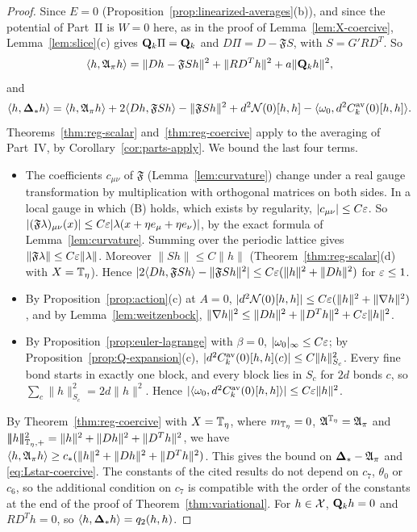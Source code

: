 \begin{proof}
Since $E=0$ (Proposition~\ref{prop:linearized-averages}(b)), and since the potential of Part~II is $W=0$ here, as in the proof of Lemma~\ref{lem:X-coercive}, Lemma~\ref{lem:slice}(c) gives $\mathbf Q_k\Pi=\mathbf Q_k$ and $D\Pi=D-\mathfrak FS$, with $S=G'RD^T$. So
\[
\langle h,\mathfrak A_\pi h\rangle=\|Dh-\mathfrak FSh\|^2+\|RD^Th\|^2+a\|\mathbf Q_kh\|^2,
\]
and
\[
\langle h,\boldsymbol{\Delta}_*h\rangle=\langle h,\mathfrak A_\pi h\rangle+2\langle Dh,\mathfrak FSh\rangle-\|\mathfrak FSh\|^2+d^2\mathcal N(0)[h,h]-\langle \omega_0,d^2C^{\rm av}_k(0)[h,h]\rangle .
\]
Theorems~\ref{thm:reg-scalar} and~\ref{thm:reg-coercive} apply to the averaging of Part~IV, by Corollary~\ref{cor:parts-apply}. We bound the last four terms.
\begin{itemize}
\item The coefficients $c_{\mu\nu}$ of $\mathfrak F$ (Lemma~\ref{lem:curvature}) change under a real gauge transformation by multiplication with orthogonal matrices on both sides. In a local gauge in which (B) holds, which exists by regularity, $|c_{\mu\nu}|\le C\varepsilon$. So $|(\mathfrak F\lambda)_{\mu\nu}(x)|\le C\varepsilon|\lambda(x+\eta e_\mu+\eta e_\nu)|$, by the exact formula of Lemma~\ref{lem:curvature}. Summing over the periodic lattice gives $\|\mathfrak F\lambda\|\le C\varepsilon\|\lambda\|$. Moreover $\|Sh\|\le C\|h\|$ (Theorem~\ref{thm:reg-scalar}(d) with $X=\mathbb T_\eta$). Hence $|2\langle Dh,\mathfrak FSh\rangle-\|\mathfrak FSh\|^2|\le C\varepsilon(\|h\|^2+\|Dh\|^2)$ for $\varepsilon\le1$.
\item By Proposition~\ref{prop:action}(c) at $A=0$, $|d^2\mathcal N(0)[h,h]|\le C\varepsilon(\|h\|^2+\|\nabla h\|^2)$, and by Lemma~\ref{lem:weitzenbock}, $\|\nabla h\|^2\le\|Dh\|^2+\|D^Th\|^2+C\varepsilon\|h\|^2$.
\item By Proposition~\ref{prop:euler-lagrange} with $\beta=0$, $|\omega_0|_\infty\le C\varepsilon$; by Proposition~\ref{prop:Q-expansion}(c), $|d^2C^{\rm av}_k(0)[h,h](c)|\le C\|h\|^2_{S_c}$. Every fine bond starts in exactly one block, and every block lies in $S_c$ for $2d$ bonds $c$, so $\sum_c\|h\|^2_{S_c}=2d\|h\|^2$. Hence $|\langle \omega_0,d^2C^{\rm av}_k(0)[h,h]\rangle|\le C\varepsilon\|h\|^2$.
\end{itemize}
By Theorem~\ref{thm:reg-coercive} with $X=\mathbb T_\eta$, where $m_{\mathbb T_\eta}=0$, $\mathfrak A^{\mathbb T_\eta}=\mathfrak A_\pi$ and $|\!|\!|h|\!|\!|_{\mathbb T_\eta,+}^2=\|h\|^2+\|Dh\|^2+\|D^Th\|^2$, we have $\langle h,\mathfrak A_\pi h\rangle\ge c_*(\|h\|^2+\|Dh\|^2+\|D^Th\|^2)$. This gives the bound on $\boldsymbol{\Delta}_*-\mathfrak A_\pi$ and \eqref{eq:Lstar-coercive}. The constants of the cited results do not depend on $c_7$, $\theta_0$ or $c_6$, so the additional condition on $c_7$ is compatible with the order of the constants at the end of the proof of Theorem~\ref{thm:variational}. For $h\in\mathcal X$, $\mathbf Q_kh=0$ and $RD^Th=0$, so $\langle h,\boldsymbol{\Delta}_*h\rangle=q_2(h,h)$.
\end{proof}
